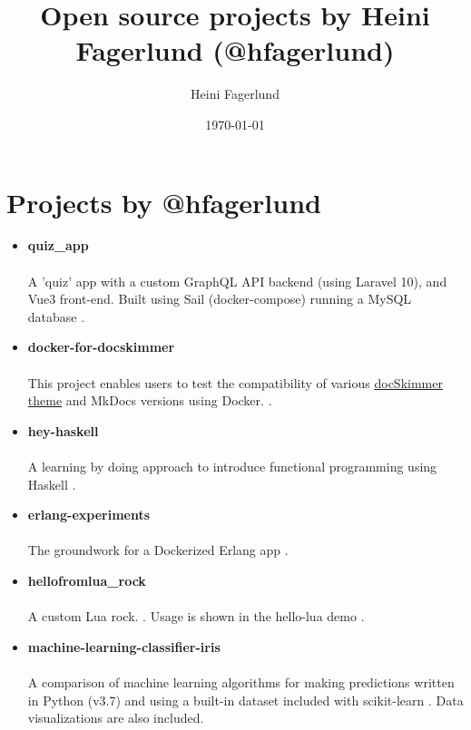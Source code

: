 \documentclass[11pt]{article}
\author{Heini Fagerlund}
\date{\today}
\title{Open source projects by Heini Fagerlund (@hfagerlund)}
\begin{document}
\maketitle

\section{Projects by @hfagerlund}
\label{sec:org210082f}
\begin{itemize}
\item \textbf{quiz\_app}
\paragraph{}
A 'quiz' app with a custom GraphQL API backend (using Laravel 10), and Vue3 front-end. Built using Sail (docker-compose) running a MySQL database \cite{quiz-app}.
\item \textbf{docker-for-docskimmer}
\paragraph{}
This project enables users to test the compatibility of various \href{https://github.com/hfagerlund/mkdocs-docskimmer}{docSkimmer theme} and MkDocs versions using Docker. \cite{docker}.
\item \textbf{hey-haskell}
\paragraph{}
A learning by doing approach to introduce functional programming using Haskell \cite{hey-haskell}.
\item \textbf{erlang-experiments}
\paragraph{}
The groundwork for a Dockerized Erlang app \cite{erlang}.
\item \textbf{hellofromlua\_rock}
\paragraph{}
A custom Lua rock. \cite{luarock}. Usage is shown in the hello-lua demo \cite{lua}.
\item \textbf{machine-learning-classifier-iris}
\paragraph{}
A comparison of machine learning algorithms for making predictions written in Python (v3.7) and using a built-in dataset included with scikit-learn \cite{machinelearning}. Data visualizations are also included.

\end{itemize}
\end{document}
